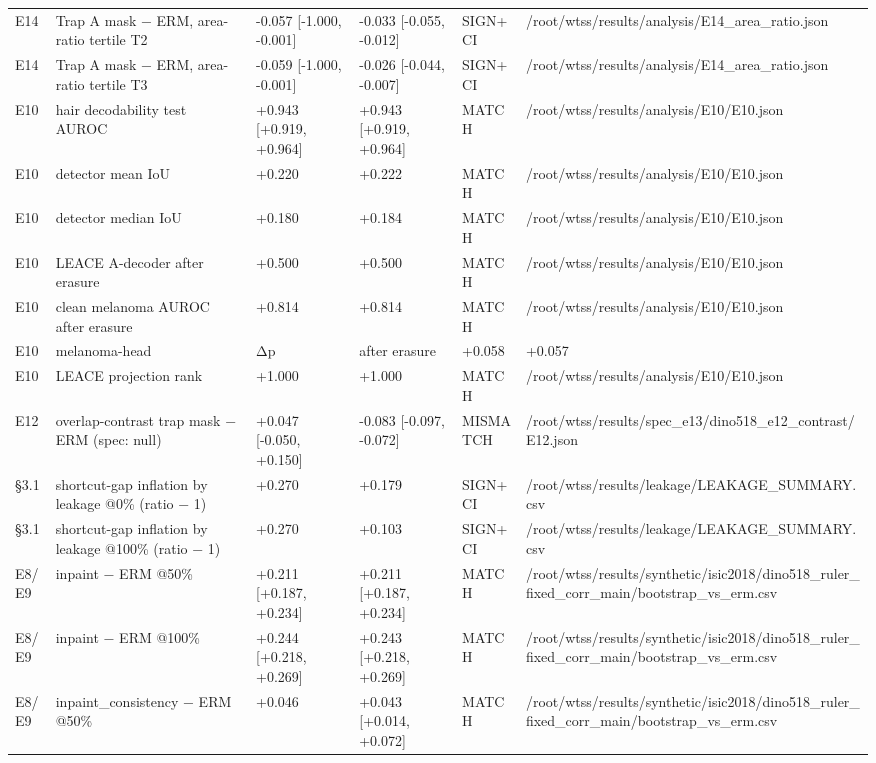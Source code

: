 {{\begin{longtable}[]{@{}llllll@{}}
E14 & Trap A mask − ERM, area-ratio tertile T2 & -0.057 {[}-1.000, -0.001{]} & -0.033 {[}-0.055, -0.012{]} & SIGN+CI & /root/wtss/results/analysis/E14\_area\_ratio.json \\
E14 & Trap A mask − ERM, area-ratio tertile T3 & -0.059 {[}-1.000, -0.001{]} & -0.026 {[}-0.044, -0.007{]} & SIGN+CI & /root/wtss/results/analysis/E14\_area\_ratio.json \\
E10 & hair decodability test AUROC & +0.943 {[}+0.919, +0.964{]} & +0.943 {[}+0.919, +0.964{]} & MATCH & /root/wtss/results/analysis/E10/E10.json \\
E10 & detector mean IoU & +0.220 & +0.222 & MATCH & /root/wtss/results/analysis/E10/E10.json \\
E10 & detector median IoU & +0.180 & +0.184 & MATCH & /root/wtss/results/analysis/E10/E10.json \\
E10 & LEACE A-decoder after erasure & +0.500 & +0.500 & MATCH & /root/wtss/results/analysis/E10/E10.json \\
E10 & clean melanoma AUROC after erasure & +0.814 & +0.814 & MATCH & /root/wtss/results/analysis/E10/E10.json \\
E10 & melanoma-head & Δp & after erasure & +0.058 & +0.057 \\
E10 & LEACE projection rank & +1.000 & +1.000 & MATCH & /root/wtss/results/analysis/E10/E10.json \\
E12 & overlap-contrast trap mask − ERM (spec: null) & +0.047 {[}-0.050, +0.150{]} & -0.083 {[}-0.097, -0.072{]} & MISMATCH & /root/wtss/results/spec\_e13/dino518\_e12\_contrast/E12.json \\
§3.1 & shortcut-gap inflation by leakage @0\% (ratio − 1) & +0.270 & +0.179 & SIGN+CI & /root/wtss/results/leakage/LEAKAGE\_SUMMARY.csv \\
§3.1 & shortcut-gap inflation by leakage @100\% (ratio − 1) & +0.270 & +0.103 & SIGN+CI & /root/wtss/results/leakage/LEAKAGE\_SUMMARY.csv \\
E8/E9 & inpaint − ERM @50\% & +0.211 {[}+0.187, +0.234{]} & +0.211 {[}+0.187, +0.234{]} & MATCH & /root/wtss/results/synthetic/isic2018/dino518\_ruler\_fixed\_corr\_main/bootstrap\_vs\_erm.csv \\
E8/E9 & inpaint − ERM @100\% & +0.244 {[}+0.218, +0.269{]} & +0.243 {[}+0.218, +0.269{]} & MATCH & /root/wtss/results/synthetic/isic2018/dino518\_ruler\_fixed\_corr\_main/bootstrap\_vs\_erm.csv \\
E8/E9 & inpaint\_consistency − ERM @50\% & +0.046 & +0.043 {[}+0.014, +0.072{]} & MATCH & /root/wtss/results/synthetic/isic2018/dino518\_ruler\_fixed\_corr\_main/bootstrap\_vs\_erm.csv \\

\end{longtable}}}
